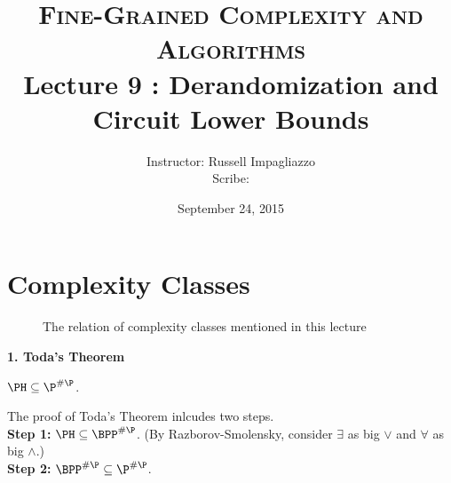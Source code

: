 \documentclass[letterpaper, 12pt]{article}
\begin{document}
 	
 
 
\title{\vspace{-50pt} \textsc{\large Fine-Grained Complexity and Algorithms}\\ \vspace{25pt} {\Large \textbf{Lecture 9 : Derandomization and Circuit Lower Bounds}}}
\author{{\normalsize Instructor: Russell Impagliazzo}\\{\normalsize Scribe: \myname}}
\date{{\normalsize September 24, 2015}}
\maketitle 
 
\section{Complexity Classes}
 
\begin{figure}[h]
\centering
	\caption{The relation of complexity classes mentioned in this lecture}
\end{figure}

\noindent \textbf{1. Toda's Theorem}

\begin{theorem}[Toda]
	$\PH \subseteq \P^{\#\P}$.
\end{theorem}
The proof of Toda's Theorem inlcudes two steps. \\
\indent \textbf{Step 1:} $\PH \subseteq \BPP^{\#\P}$.
(By Razborov-Smolensky, consider $\exists$ as big $\vee$ and $\forall$ as big $\wedge$.)\\
\indent \textbf{Step 2:} $\BPP^{\#\P} \subseteq \P^{\#\P}$.

\bigskip
\end{document}
